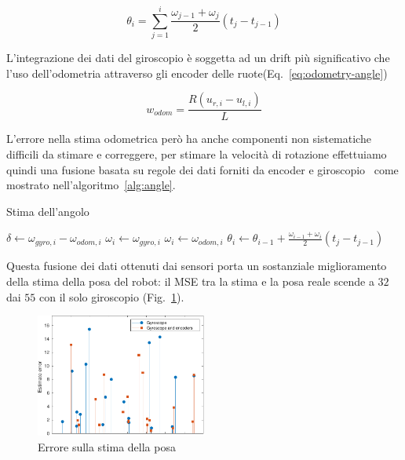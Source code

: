 \documentclass[a4paper]{article}
\begin{document}
	\begin{equation}\label{eq:gyro-integration}
		\theta_i = \sum_{j=1}^i \frac{\omega _{j-1}+\omega _j}{2} \left( t_j-t_{j-1} \right) 
	\end{equation}

	L'integrazione dei dati del giroscopio è soggetta ad un drift più
	significativo che l'uso dell'odometria attraverso gli encoder delle
	ruote(Eq.~\ref{eq:odometry-angle})

	\begin{equation}\label{eq:odometry-angle}
		w_{odom}= \frac	{R(u_{r,i}-u_{l,i})} {L} 
	\end{equation}
	
	L'errore nella stima odometrica però ha anche componenti non sistematiche
	difficili da stimare e correggere, per stimare la velocità di rotazione
	effettuiamo quindi una fusione basata su regole dei dati forniti da encoder
	e giroscopio~\cite{gyrodometry, 572228} come mostrato
	nell'algoritmo~\ref{alg:angle}.

	\begin{algorithm}[H]
	\caption{Stima dell'angolo}\label{alg:angle}
		\DontPrintSemicolon
		\SetAlgoLined
		
		$ \delta \leftarrow \omega_{gyro,i}-\omega_{odom,i} $ \;
			{$\omega_i \leftarrow \omega_{gyro,i}$}
		\Else 
			{$\omega_i \leftarrow \omega_{odom,i}$}
		$\theta_i \leftarrow  \theta_{i-1}+ \frac{\omega _{i-1}+\omega _i}{2} \left( t_j-t_{j-1} \right) $\;

		\;
	\end{algorithm}

	Questa fusione dei dati ottenuti dai sensori porta un sostanziale miglioramento della stima della posa del robot: il MSE tra la stima e la posa reale scende a $ 32 $ dai $ 55 $ con il solo giroscopio (Fig.~\ref{fig:sensor_fusion}).

	\begin{figure}[H]
		\centering
		\includegraphics[width=0.5\textwidth]{./img/sensor_fusion.pdf}
		\caption{Errore sulla stima della posa}
		\label{fig:sensor_fusion}
	\end{figure}
	
\end{document}
